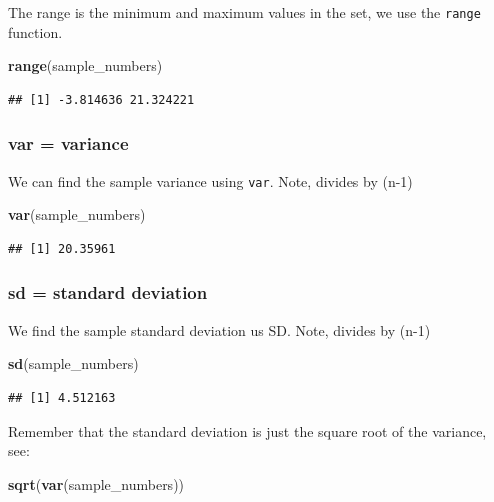 \documentclass[
]{book}
\newenvironment{Shaded}{\begin{snugshade}}{\end{snugshade}}
\newcommand{\FunctionTok}[1]{\textcolor[rgb]{0.13,0.29,0.53}{\textbf{#1}}}
\newcommand{\NormalTok}[1]{#1}
\begin{document}
The range is the minimum and maximum values in the set, we use the \texttt{range} function.

\begin{Shaded}
\begin{Highlighting}[]
\FunctionTok{range}\NormalTok{(sample\_numbers)}
\end{Highlighting}
\end{Shaded}

\begin{verbatim}
## [1] -3.814636 21.324221
\end{verbatim}

\hypertarget{var-variance}{%
\subsubsection{var = variance}\label{var-variance}}

We can find the sample variance using \texttt{var}. Note, divides by (n-1)

\begin{Shaded}
\begin{Highlighting}[]
\FunctionTok{var}\NormalTok{(sample\_numbers)}
\end{Highlighting}
\end{Shaded}

\begin{verbatim}
## [1] 20.35961
\end{verbatim}

\hypertarget{sd-standard-deviation}{%
\subsubsection{sd = standard deviation}\label{sd-standard-deviation}}

We find the sample standard deviation us SD. Note, divides by (n-1)

\begin{Shaded}
\begin{Highlighting}[]
\FunctionTok{sd}\NormalTok{(sample\_numbers)}
\end{Highlighting}
\end{Shaded}

\begin{verbatim}
## [1] 4.512163
\end{verbatim}

Remember that the standard deviation is just the square root of the variance, see:

\begin{Shaded}
\begin{Highlighting}[]
\FunctionTok{sqrt}\NormalTok{(}\FunctionTok{var}\NormalTok{(sample\_numbers))}
\end{Highlighting}
\end{Shaded}
\end{document}
